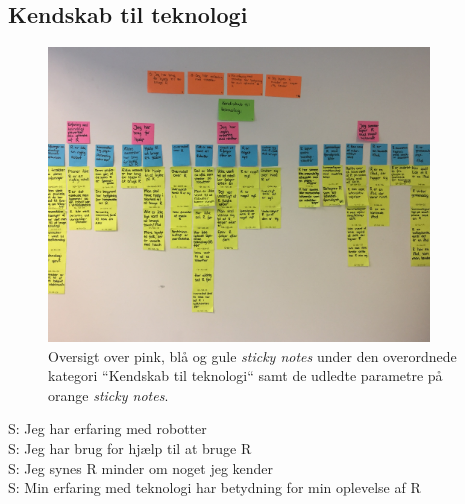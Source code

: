 \subsection{Kendskab til teknologi}
%
\begin{figure}[H]
\centering
\includegraphics[width = 0.9\textwidth]{Figure/AffinityDiagram/KendskabTilTeknologi} 
\caption{Oversigt over pink, blå og gule \textit{sticky notes} under den overordnede kategori ``Kendskab til teknologi`` samt de udledte parametre på orange \textit{sticky notes}.}
\label{fig:AFKendskabTilTeknologi}
\end{figure}
\noindent
%
S: Jeg har erfaring med robotter\\
S: Jeg har brug for hjælp til at bruge R\\
S: Jeg synes R minder om noget jeg kender\\
S: Min erfaring med teknologi har betydning for min oplevelse af R

